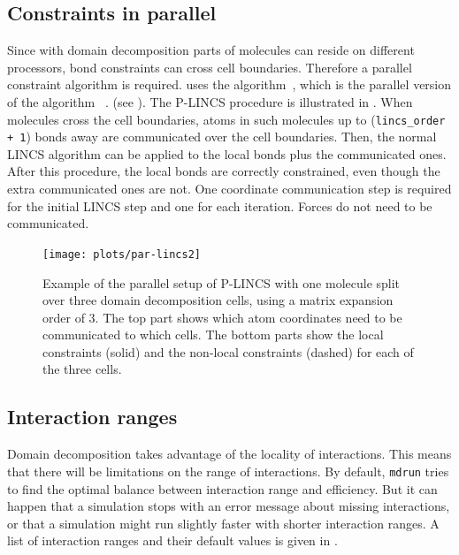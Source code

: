 \subsection{Constraints in parallel}
\label{subsec:plincs}
Since with domain decomposition parts of molecules can reside
on different processors, bond constraints can cross cell boundaries.
Therefore a parallel constraint algorithm is required.
{\gromacs} uses the  algorithm~\cite{Hess2008a},
which is the parallel version of the  algorithm~\cite{Hess97}
{.}
{(see ).}
The P-LINCS procedure is illustrated in .
When molecules cross the cell boundaries, atoms in such molecules
up to ({\tt lincs_order + 1}) bonds away are communicated over the cell boundaries.
Then, the normal LINCS algorithm can be applied to the local bonds
plus the communicated ones. After this procedure, the local bonds
are correctly constrained, even though the extra communicated ones are not.
One coordinate communication step is required for the initial LINCS step
and one for each iteration. Forces do not need to be communicated.

\begin{figure}
\centerline{\texttt{[image: plots/par-lincs2]}}
\caption{
Example of the parallel setup of P-LINCS with one molecule
split over three domain decomposition cells, using a matrix
expansion order of 3.
The top part shows which atom coordinates need to be communicated
to which cells. The bottom parts show the local constraints (solid)
and the non-local constraints (dashed) for each of the three cells.
\label{fig:plincs}
}
\end{figure}

\subsection{Interaction ranges}
Domain decomposition takes advantage of the locality of interactions.
This means that there will be limitations on the range of interactions.
By default, {\tt mdrun} tries to find the optimal balance between
interaction range and efficiency. But it can happen that a simulation
stops with an error message about missing interactions,
or that a simulation might run slightly faster with shorter
interaction ranges. A list of interaction ranges
and their default values is given in .

